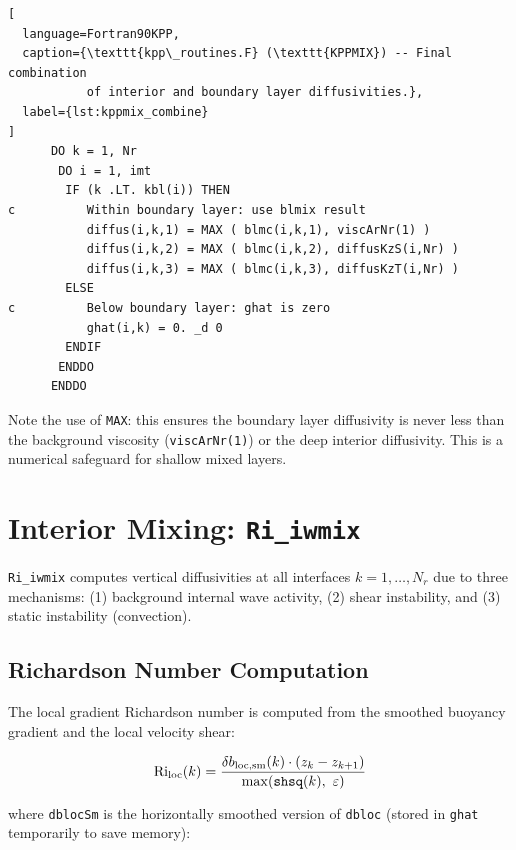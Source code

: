 \documentclass[12pt,letterpaper]{article}
\newcommand{\Ri}{\mathrm{Ri}}
\begin{document}
\begin{lstlisting}[  
  language=Fortran90KPP,  
  caption={\texttt{kpp\_routines.F} (\texttt{KPPMIX}) -- Final combination  
           of interior and boundary layer diffusivities.},  
  label={lst:kppmix_combine}  
]  
      DO k = 1, Nr  
       DO i = 1, imt  
        IF (k .LT. kbl(i)) THEN  
c          Within boundary layer: use blmix result  
           diffus(i,k,1) = MAX ( blmc(i,k,1), viscArNr(1) )  
           diffus(i,k,2) = MAX ( blmc(i,k,2), diffusKzS(i,Nr) )  
           diffus(i,k,3) = MAX ( blmc(i,k,3), diffusKzT(i,Nr) )  
        ELSE  
c          Below boundary layer: ghat is zero  
           ghat(i,k) = 0. _d 0  
        ENDIF  
       ENDDO  
      ENDDO  
\end{lstlisting}  
  
Note the use of \texttt{MAX}: this ensures the boundary layer  
diffusivity is never less than the background viscosity  
(\texttt{viscArNr(1)}) or the deep interior diffusivity. This is a  
numerical safeguard for shallow mixed layers.  
  
\section{Interior Mixing: \texttt{Ri\_iwmix}}  
  
\texttt{Ri\_iwmix} computes vertical diffusivities at all interfaces  
$k = 1, \ldots, N_r$ due to three mechanisms: (1) background internal  
wave activity, (2) shear instability, and (3) static instability  
(convection).  
  
\subsection{Richardson Number Computation}  
  
The local gradient Richardson number is computed from the smoothed  
buoyancy gradient and the local velocity shear:  
  
\begin{equation}  
\Ri_{\rm loc}(k) = \frac{\delta b_{\rm loc,sm}(k) \cdot  
(z_k - z_{k+1})}{\max(\texttt{shsq}(k),\ \varepsilon)}  
\end{equation}  
  
where \texttt{dblocSm} is the horizontally smoothed version of  
\texttt{dbloc} (stored in \texttt{ghat} temporarily to save memory):  
  
\end{document}
